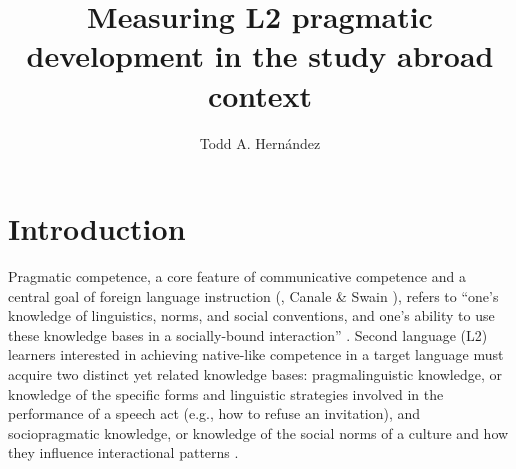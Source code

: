\documentclass[output=paper]{langscibook}
\author{Todd A. Hernández\affiliation{Marquette University}}
\title{Measuring L2 pragmatic development in the study abroad context}
\begin{document}
\AffiliationsWithoutIndexing{}
\maketitle




\section{Introduction}

Pragmatic competence, a core feature of communicative competence and a central goal of foreign language instruction (\citealt{BachmanPalmer1996}, Canale \& Swain \citeyear{CanaleSwain1980}), refers to “one’s knowledge of linguistics, norms, and social conventions, and one’s ability to use these knowledge bases in a socially-bound interaction” \citep[1]{Taguchi2015}. Second language (L2) learners interested in achieving native-like competence in a target language must acquire two distinct yet related knowledge bases: pragmalinguistic knowledge, or knowledge of the specific forms and linguistic strategies involved in the performance of a speech act (e.g., how to refuse an invitation), and sociopragmatic knowledge, or knowledge of the social norms of a culture and how they influence interactional patterns \citep{Thomas1983}.
\end{document}
